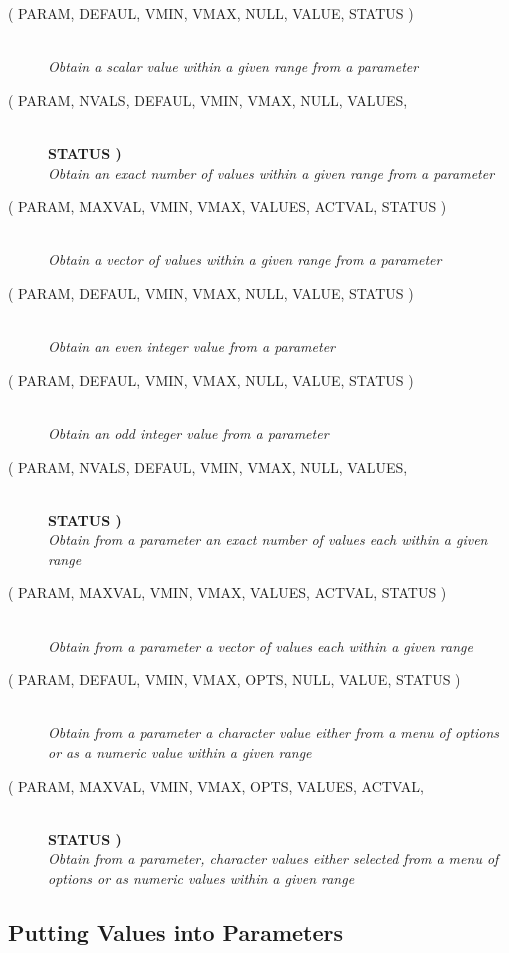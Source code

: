 \documentclass[twoside,11pt,nolof]{starlink}
\providecommand{\listline}{\hspace{1pt}\\}
\providecommand{\listova}[1]{}
\providecommand{\listovb}[1]{\textbf{#1}\\}
\begin{document}
\begin{description}
\item [
( PARAM, DEFAUL, VMIN, VMAX, NULL, VALUE, STATUS )] \listline
\textit{Obtain a scalar value within a given range from a parameter}
\item [
( PARAM, NVALS, DEFAUL, VMIN, VMAX, NULL, VALUES, \listova{STATUS )}] \listline
\listovb{STATUS )}
\textit{Obtain an exact number of values within a given range from a parameter}
\item [
( PARAM, MAXVAL, VMIN, VMAX, VALUES, ACTVAL, STATUS )] \listline
\textit{Obtain a vector of values within a given range from a parameter}
\item [
( PARAM, DEFAUL, VMIN, VMAX, NULL, VALUE, STATUS )] \listline
\textit{Obtain an even integer value from a parameter}
\item [
( PARAM, DEFAUL, VMIN, VMAX, NULL, VALUE, STATUS )] \listline
\textit{Obtain an odd integer value from a parameter}
\item [
( PARAM, NVALS, DEFAUL, VMIN, VMAX, NULL, VALUES, \listova{STATUS )}] \listline
\listovb{STATUS )}
\textit{Obtain from a parameter an exact number of values each within a
             given range}
\item [
( PARAM, MAXVAL, VMIN, VMAX, VALUES, ACTVAL, STATUS )] \listline
\textit{Obtain from a parameter a vector of values each within a given
             range}
\item [
( PARAM, DEFAUL, VMIN, VMAX, OPTS, NULL, VALUE, STATUS )] \listline
\textit{Obtain from a parameter a character value either from a menu of
             options or as a numeric value within a given range}
\item [
( PARAM, MAXVAL, VMIN, VMAX, OPTS, VALUES, ACTVAL, \listova{STATUS )}] \listline
\listovb{STATUS )}
\textit{Obtain from a parameter, character values either selected from a
             menu of options or as numeric values within a given range}
\end{description}


\subsection{Putting Values into Parameters}
\end{document}
